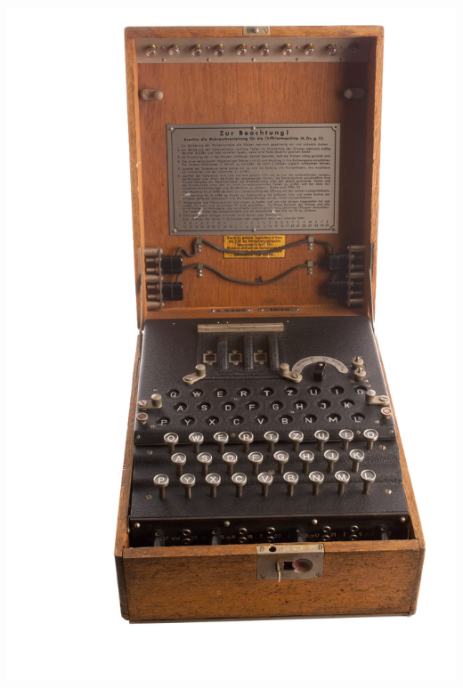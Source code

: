 \begin{frame}
\begin{minipage}{0.2\textwidth}
{\includegraphics[width=2\textwidth]{figures/Enigma_Machine.png} 
}  
\end{minipage}

\end{frame}


